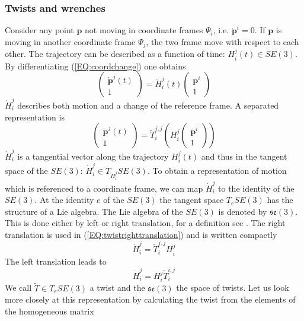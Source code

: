 \documentclass[a4paper,twoside, openright,12pt]{report}
\newcommand{\f}[1]{\boldsymbol{#1}}
\begin{document}
{\subsubsection{Twists and wrenches}
Consider any point $ \f{p} $ not moving in coordinate frames $\Psi_i $, i.e. $ \dot{\f{p}}^i = 0 $. If $ \f{p} $ is moving in another coordinate frame $ \Psi_j $, the two frame move with respect to each other. The trajectory can be described as a function of time: $H_i^j(t) \in SE(3)$. By differentiating (\ref{EQ:coordchange}) one obtains
\[\begin{pmatrix}\dot{\f{p}}^j(t) \\ 1\end{pmatrix} = \dot{H}_i^j(t) \begin{pmatrix}\f{p}^i \\ 1\end{pmatrix} \]
$ \dot{H}_i^j $ describes both motion and a change of the reference frame. A separated representation is
\begin{equation}\label{EQ:twistrighttranslation}
	\begin{pmatrix}\dot{\f{p}}^j(t) \\ 1\end{pmatrix} = \tilde{T}_i^{j,j}\left(H_i^{j}\begin{pmatrix}\f{p}^i \\ 1\end{pmatrix}\right)
\end{equation}
$ \dot{H}_i^j$ is a tangential vector along the trajectory $H_i^j(t)$ and thus in the tangent space of the $SE(3)$: $ \dot{H}_i^j \in T_{H_i^j}SE(3)$. To obtain a representation of motion which is referenced to a coordinate frame, we can map $\dot{H}_i^j$ to the identity of the $SE(3)$. At the identity $ e $ of the $SE(3)$ the tangent space $ T_e SE(3) $ has the structure of a Lie algebra. The Lie algebra of the $SE(3)$ is denoted by $\mathfrak{se}(3)$. This is done either by left or right translation, for a definition see \cite{Stramigioli_01}. The right translation is used in (\ref{EQ:twistrighttranslation}) and is written compactly
\begin{equation}\label{EQ:righttranslation}
\dot{H}_i^j = \tilde{T}_i^{j,j} H_i^j
\end{equation}\label{EQ:lefttranslation}
The left translation leads to
\begin{equation}
\dot{H}_i^j = H_i^j \tilde{T}_i^{i,j} 
\end{equation}
We call $\tilde{T} \in T_e SE(3)$ a twist and the $\mathfrak{se}(3)$ the space of twists.
Let us look more closely at this representation by calculating the twist from the elements of the homogeneous matrix

}
\end{document}
